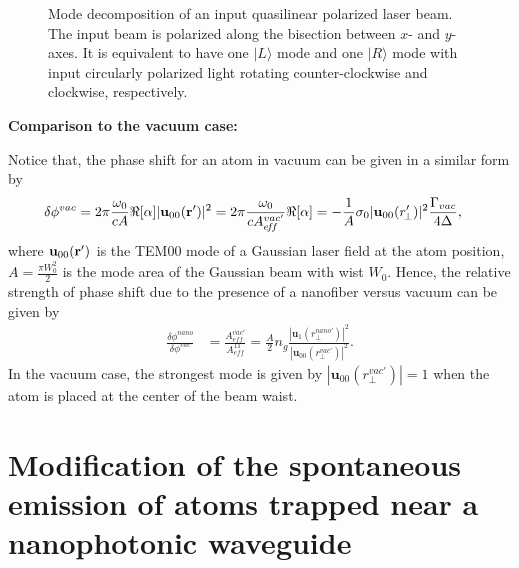 \begin{figure}
\centering{}
\caption{Mode decomposition of an input quasilinear polarized laser beam. The input beam is polarized along the bisection between $ x $- and $ y $-axes. It is equivalent to have one $ |L\rangle $ mode and one $ |R\rangle $ mode with input circularly polarized light rotating counter-clockwise and clockwise, respectively.}
\end{figure}

\bigskip
\textbf{Comparison to the vacuum case:}

Notice that, the phase shift for an atom in vacuum can be given in a similar form by
\begin{align}
\delta\phi^{vac} &= 2\pi \frac{\omega_0}{cA} \Re[\alpha] |\mathbf{u}_{00}(\mathbf{r}')|^2 =  2\pi \frac{\omega_0}{c A^{vac'}_{e\!f\!f}} \Re[\alpha]=-\frac{1}{A} \sigma_0 |\mathbf{u}_{00} (r'_{\!\perp})|^2 \frac{\Gamma_{vac}}{4\Delta},
\end{align}
where $\mathbf{u}_{00}(\mathbf{r}')  $ is the TEM00 mode of a Gaussian laser field at the atom position, $ A=\frac{\pi W_0^2}{2} $ is the mode area of the Gaussian beam with wist $ W_0 $. Hence, the relative strength of phase shift due to the presence of a nanofiber versus vacuum can be given by
\begin{align}
\frac{\delta\phi^{nano}}{\delta\phi^{vac}} &=\frac{A_{e\!f\!f}^{vac'}}{A_{e\!f\!f}^{11}}= \frac{A}{2} \!n_g\! \frac{|\mathbf{u}_1(r_\perp^{nano'})|^2}{|\mathbf{u}_{00}(r_\perp^{vac'})|^2}.
\end{align}
In the vacuum case, the strongest mode is given by $ |\mathbf{u}_{00}(r_\perp^{vac'})|=1 $ when the atom is placed at the center of the beam waist. 



\section{Modification of the spontaneous emission of atoms trapped near a nanophotonic waveguide}

